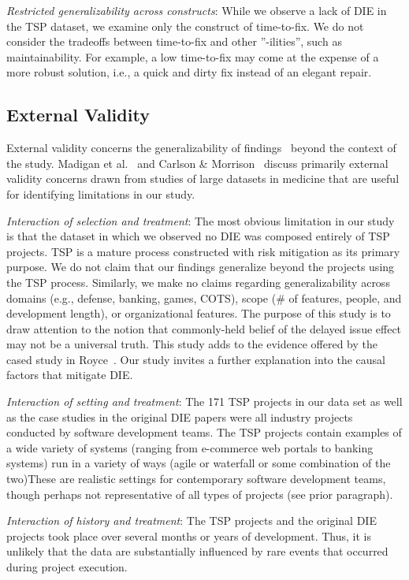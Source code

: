 \documentclass[smallcondensed]{svjour3}
\begin{document}
\textit{Restricted generalizability across constructs}: While we observe a lack of DIE in the TSP dataset, we examine only the construct of time-to-fix. We do not consider the tradeoffs between time-to-fix and other ''-ilities'', such as maintainability. For example, a low time-to-fix may come at the expense of a more robust solution, i.e., a quick and dirty fix instead of an elegant repair.

\subsection{External Validity}
External validity concerns the generalizability of findings~\cite{wohlin2012} beyond the context of the study. Madigan et al.~\cite{madigan2014} and Carlson \& Morrison~\cite{carlson2009} discuss primarily external validity concerns drawn from studies of large datasets in medicine that are useful for identifying limitations in our study.

\textit{Interaction of selection and treatment}: The most obvious limitation in our study is that the dataset in which we observed no DIE was composed entirely of TSP projects. TSP is a mature process constructed with risk mitigation as its primary purpose. We do not claim that our findings generalize beyond the projects using the TSP process. Similarly, we make no claims regarding generalizability across domains (e.g., defense, banking, games, COTS), scope (\# of features, people, and development length), or organizational features. The purpose of this study is to draw attention to the notion that commonly-held belief of the delayed issue effect may not be a universal truth. This study adds to the evidence offered by the cased study in Royce~\cite{Royce98}. Our study invites a further explanation into the causal factors that mitigate DIE.



\textit{Interaction of setting and treatment}: The 171 TSP projects in our data set as well as the case studies in the original DIE papers were all industry projects conducted by software development teams. The TSP projects contain examples of a wide variety
 of systems (ranging from e-commerce web portals to  banking systems) run in a variety of
 ways (agile or  waterfall or some combination of the two)These are realistic settings for contemporary software development teams, though perhaps not representative of all types of projects (see prior paragraph). 


\textit{Interaction of history and treatment}: The TSP projects and the original DIE projects took place over several months or years of development. Thus, it is unlikely that the data are substantially influenced by rare events that occurred during project execution.
\end{document}
